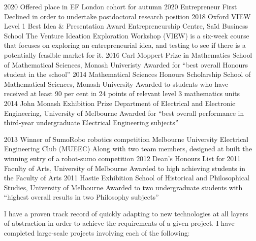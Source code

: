 \documentclass[9pt]{developercv} %
\begin{document}

\begin{entrylist}
  \entry
    {2020}
    {Offered place in EF London cohort for autumn 2020}
    {Entrepreneur First}
    {Declined in order to undertake postdoctoral research position}
  \entry
    {2018}
    {Oxford VIEW Level 1 Best Idea \& Presentation Award}
    {Entrepreneurship Centre, Sa\"id Business School}
    {The Venture Ideation Exploration Workshop (VIEW) is a six-week course that focuses on exploring an entrepreneurial idea, and testing to see if there is a potentially feasible market for it.}
  \entry
    {2016}
    {Carl Moppert Prize in Mathematics}
    {School of Mathematical Sciences, Monash Univeristy}
    {Awarded for ``best overall Honours student in the school''}
  \entry
    {2014}
    {Mathematical Sciences Honours Scholarship}
    {School of Mathematical Sciences, Monash University}
    {Awarded to students who have received at least 90 per cent in 24 points of relevant level 3 mathematics units}
  \entry
    {2014}
    {John Monash Exhibition Prize}
    {Department of Electrical and Electronic Engineering, University of Melbourne}
    {Awarded for ``best overall performance in third-year undergraduate Electrical Engineering subjects''}

  \entry
    {2013}
    {Winner of SumoRobo robotics competition}
    {Melbourne University Electrical Engineering Club (MUEEC)}
    {Along with two team members, designed at built the winning entry of a robot-sumo competition}
  \entry
    {2012}
    {Dean's Honours List for 2011}
    {Faculty of Arts, University of Melbourne}
    {Awarded to high achieving students in the Faculty of Arts}
  \entry
    {2011}
    {Hastie Exhibition}
    {School of Historical and Philosophical Studies, University of Melbourne}
    {Awarded to two undergraduate students with ``highest overall results in two Philosophy subjects''}
\end{entrylist}

\newpage


I have a proven track record of quickly adapting to new technologies at all layers of abstraction in order to achieve the requirements of a given project.
I have completed large-scale projects involving each of the following:

\vspace{.25cm}
\end{document}
